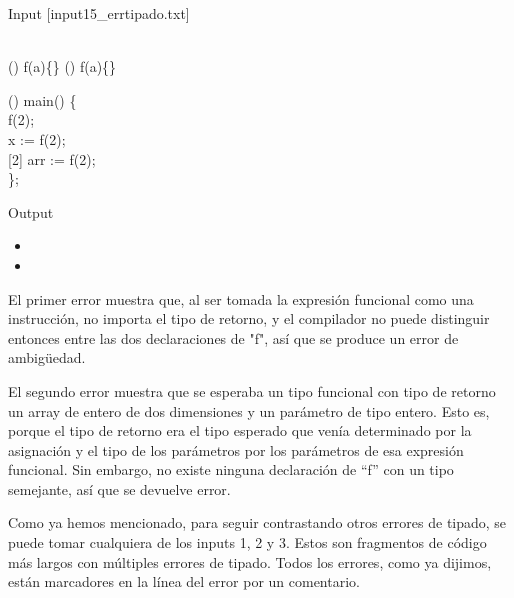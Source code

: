 Input [input15\_errtipado.txt]

\begin{algorithm}
	\\
	\Boolean{}(\Integer{}) f(a)\{\}\;
	\Integer{}(\Integer{}) f(a)\{\}\;
	
	\Integer{}() main() \{ \\
		\quad f(2);\\
		\quad \Integer{} x := f(2); \\
		\quad \Integer{}[2] arr := f(2); \\
	\};
\end{algorithm}

Output



\begin{itemize}
	\item {}
	\item {}
\end{itemize}

El primer error muestra que, al ser tomada la expresión funcional como una instrucción, no importa el tipo de retorno, y 
el compilador no puede distinguir entonces entre las dos declaraciones de "f", así que se produce un error de ambigüedad.

El segundo error muestra que se esperaba un tipo funcional con tipo de retorno un array de entero de dos dimensiones
y un parámetro de tipo entero. Esto es, porque el tipo de retorno era el tipo esperado que venía determinado por la 
asignación y el tipo de los parámetros por los parámetros de esa expresión funcional. Sin embargo, no existe ninguna 
declaración de ``f'' con un tipo semejante, así que se devuelve error.

Como ya hemos mencionado, para seguir contrastando otros errores de tipado, se puede tomar cualquiera de los inputs 1, 2 y 3.
Estos son fragmentos de código más largos con múltiples errores de tipado. Todos los errores, como ya dijimos, están marcadores
en la línea del error por un comentario.